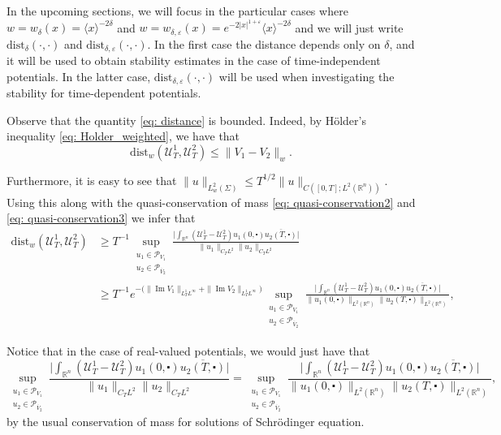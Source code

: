 \documentclass[10pt,a4paper]{amsart}
\theoremstyle{remark}
\theoremstyle{definition}
\newcommand{\R}{\mathbb{R}}
\newcommand{\dist}{\mathrm{dist}}
\def\Im{\mathop\mathrm{Im}}
\def\ve{\varepsilon}
\def\cal{\mathcal}
\def\ovl{\overline}
\def\cd{\centerdot}
\begin{document}
In the upcoming sections, we will focus in the particular cases where $w=w_\delta(x)=\langle x\rangle^{-2\delta}$ and $w=w_{\delta,\ve}(x)=e^{-2|x|^{1+\varepsilon}}\langle x\rangle^{-2\delta}$ and we will just write $\dist_\delta(\cdot, \cdot)$ and $\dist_{\delta, \ve}(\cdot, \cdot)$.
In the first case the distance depends only on $\delta$, and it will be used to obtain stability estimates in the case of time-independent potentials.
In the latter case, $\dist_{\delta, \ve}(\cdot, \cdot)$ will be used when investigating the stability for time-dependent potentials. 



Observe that the quantity \eqref{eq: distance} is bounded. Indeed, by H\"older's inequality \eqref{eq: Holder_weighted}, we have that 
%
\begin{equation}\label{eq: dist_bound}
\dist_w(\cal{U}_T^1, \cal{U}_T^2) \leq \| V_1-V_2 \|_w.
\end{equation}
% 


Furthermore, it is easy to see that $\|u\|_{L^2_w(\Sigma)}\leq T^{1/2} \|u\|_{C([0, T]; L^2(\R^n))}$. Using this along with the quasi-conservation of mass \eqref{eq: quasi-conservation2} and \eqref{eq: quasi-conservation3} we infer that 
%
\begin{align*}
\dist_{w}(\cal{U}_T^1, \cal{U}_T^2) &\geq 
 T^{-1} \sup_{\substack{u_1\in\mathcal P_{V_1}\\ u_2\in\mathcal P_{\ovl V_2}}} \frac{\Big| \displaystyle \int_{\R^n} (\cal{U}_T^1-\cal{U}_T^2) u_1(0, \cd) \ovl{u_2(T, \cd)} \Big|}{\|u_1\|_{C_TL^2} \|u_2\|_{C_TL^2}} \\
&\geq T^{-1} e^{ - \big(\|\Im V_1\|_{L^1_TL^\infty} + \|\Im V_2\|_{L^1_TL^\infty} \big)} \sup_{\substack{u_1\in\mathcal P_{V_1}\\ u_2\in\mathcal P_{\ovl V_2}}} \frac{\Big| \displaystyle \int_{\R^n} (\cal{U}_T^1-\cal{U}_T^2) u_1(0, \cd) \ovl{u_2(T, \cd)} \Big|}{\|u_1(0, \cd)\|_{L^2(\R^n)} \|u_2(T, \cd)\|_{L^2(\R^n)}},
\end{align*} 
%

Notice that in the case of real-valued potentials, we would just have that
\[ 
\sup_{\substack{u_1\in\mathcal P_{V_1}\\ u_2\in\mathcal P_{\ovl V_2}}} \frac{\Big| \displaystyle \int_{\R^n} (\cal{U}_T^1-\cal{U}_T^2) u_1(0, \cd) \ovl{u_2(T, \cd)} \Big|}{\|u_1\|_{C_TL^2} \| u_2\|_{ C_TL^2}} = \sup_{\substack{u_1\in\mathcal P_{V_1}\\ u_2\in\mathcal P_{\ovl V_2}}} \frac{\Big| \displaystyle \int_{\R^n} (\cal{U}_T^1-\cal{U}_T^2) u_1(0, \cd) \ovl{u_2(T, \cd)} \Big|}{\|u_1(0, \cd)\|_{L^2(\R^n)} \|u_2(T, \cd)\|_{L^2(\R^n)}},
\]
by the usual conservation of mass for solutions of Schr\"odinger equation. 
\end{document}
